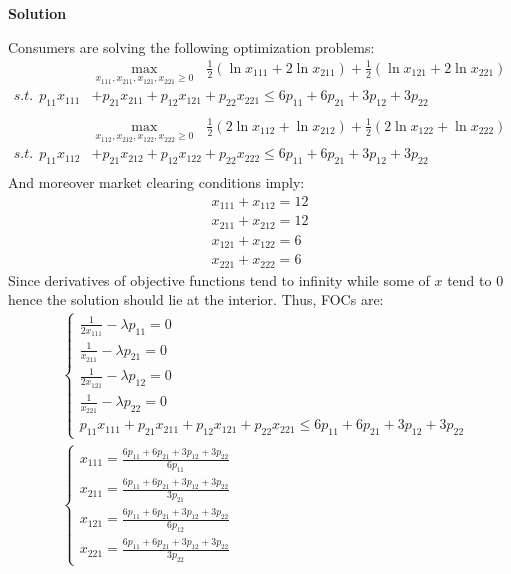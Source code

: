 \documentclass[a4paper]{article}
\begin{document}
\textbf{Solution}


Consumers are solving the following optimization problems:
\begin{align*}
&\underset{x_{111}, x_{211}, x_{121}, x_{221} \ge 0}{\max}\ \ \ \frac{1}{2}(\ln x_{111} + 2\ln x_{211}) + \frac{1}{2}(\ln x_{121} + 2\ln x_{221})\\
s.t.\ \  p_{11}x_{111}& + p_{21}x_{211} + p_{12}x_{121} + p_{22}x_{221} \le 6p_{11} + 6p_{21} + 3p_{12} + 3p_{22}\\
\\
&\underset{x_{112}, x_{212}, x_{122}, x_{222} \ge 0}{\max}\ \ \ \frac{1}{2}(2\ln x_{112} + \ln x_{212}) + \frac{1}{2}(2\ln x_{122} + \ln x_{222})\\
s.t.\ \  p_{11}x_{112}& + p_{21}x_{212} + p_{12}x_{122} + p_{22}x_{222} \le 6p_{11} + 6p_{21} + 3p_{12} + 3p_{22}\\
\end{align*}
And moreover market clearing conditions imply:
\begin{align*}
x_{111} + x_{112} = 12 \nonumber\\
x_{211} + x_{212} = 12\nonumber\\
x_{121} + x_{122} = 6\\
x_{221} + x_{222} = 6\nonumber
\end{align*}
Since derivatives of objective functions tend to infinity while some of $x$ tend to 0 hence the solution should lie at the interior. Thus, FOCs are:
\begin{align*}
&\begin{cases}
\frac{1}{2x_{111}} - \lambda p_{11} = 0\\
\frac{1}{x_{211}} - \lambda p_{21} = 0\\
\frac{1}{2x_{121}} - \lambda p_{12} = 0\\
\frac{1}{x_{221}} - \lambda p_{22} = 0\\
p_{11}x_{111} + p_{21}x_{211} + p_{12}x_{121} + p_{22}x_{221} \le 6p_{11} + 6p_{21} + 3p_{12} + 3p_{22}
\end{cases} \\
&\begin{cases}
x_{111} = \frac{6p_{11} + 6p_{21} + 3p_{12} + 3p_{22}}{6p_{11}}\\
x_{211} = \frac{6p_{11} + 6p_{21} + 3p_{12} + 3p_{22}}{3p_{21}}\\
x_{121} = \frac{6p_{11} + 6p_{21} + 3p_{12} + 3p_{22}}{6p_{12}}\\
x_{221} = \frac{6p_{11} + 6p_{21} + 3p_{12} + 3p_{22}}{3p_{22}}
\end{cases}
\end{align*}
\end{document}
